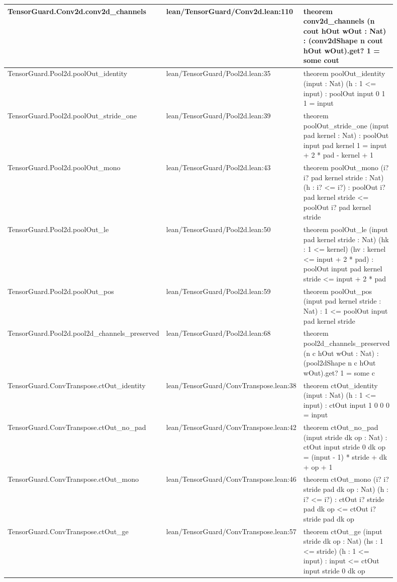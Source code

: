 \documentclass[10pt]{article}
\begin{document}
\begin{longtable}{|p{0.30\linewidth}|p{0.14\linewidth}|p{0.46\linewidth}|}
\hline
TensorGuard.Conv2d.conv2d\_channels & lean/TensorGuard/Conv2d.lean:110 & theorem conv2d\_channels (n cout hOut wOut : Nat) : (conv2dShape n cout hOut wOut).get? 1 = some cout \\
\hline
TensorGuard.Pool2d.poolOut\_identity & lean/TensorGuard/Pool2d.lean:35 & theorem poolOut\_identity (input : Nat) (h : 1 <= input) : poolOut input 0 1 1 = input \\
\hline
TensorGuard.Pool2d.poolOut\_stride\_one & lean/TensorGuard/Pool2d.lean:39 & theorem poolOut\_stride\_one (input pad kernel : Nat) : poolOut input pad kernel 1 = input + 2 * pad - kernel + 1 \\
\hline
TensorGuard.Pool2d.poolOut\_mono & lean/TensorGuard/Pool2d.lean:43 & theorem poolOut\_mono (i? i? pad kernel stride : Nat) (h : i? <= i?) : poolOut i? pad kernel stride <= poolOut i? pad kernel stride \\
\hline
TensorGuard.Pool2d.poolOut\_le & lean/TensorGuard/Pool2d.lean:50 & theorem poolOut\_le (input pad kernel stride : Nat) (hk : 1 <= kernel) (hv : kernel <= input + 2 * pad) : poolOut input pad kernel stride <= input + 2 * pad \\
\hline
TensorGuard.Pool2d.poolOut\_pos & lean/TensorGuard/Pool2d.lean:59 & theorem poolOut\_pos (input pad kernel stride : Nat) : 1 <= poolOut input pad kernel stride \\
\hline
TensorGuard.Pool2d.pool2d\_channels\_preserved & lean/TensorGuard/Pool2d.lean:68 & theorem pool2d\_channels\_preserved (n c hOut wOut : Nat) : (pool2dShape n c hOut wOut).get? 1 = some c \\
\hline
TensorGuard.ConvTranspose.ctOut\_identity & lean/TensorGuard/ConvTranspose.lean:38 & theorem ctOut\_identity (input : Nat) (h : 1 <= input) : ctOut input 1 0 0 0 = input \\
\hline
TensorGuard.ConvTranspose.ctOut\_no\_pad & lean/TensorGuard/ConvTranspose.lean:42 & theorem ctOut\_no\_pad (input stride dk op : Nat) : ctOut input stride 0 dk op = (input - 1) * stride + dk + op + 1 \\
\hline
TensorGuard.ConvTranspose.ctOut\_mono & lean/TensorGuard/ConvTranspose.lean:46 & theorem ctOut\_mono (i? i? stride pad dk op : Nat) (h : i? <= i?) : ctOut i? stride pad dk op <= ctOut i? stride pad dk op \\
\hline
TensorGuard.ConvTranspose.ctOut\_ge & lean/TensorGuard/ConvTranspose.lean:57 & theorem ctOut\_ge (input stride dk op : Nat) (hs : 1 <= stride) (h : 1 <= input) : input <= ctOut input stride 0 dk op \\

\end{longtable}
\end{document}

